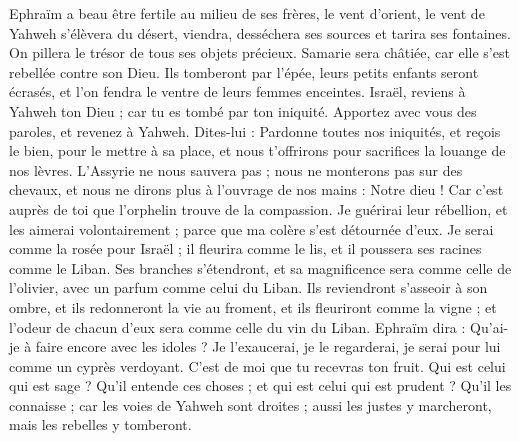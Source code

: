 \begin{multicols}{2}
Ephraïm a beau être fertile au milieu de ses frères, le vent d'orient, le vent de Yahweh s'élèvera du désert, viendra, desséchera ses sources et tarira ses fontaines. On pillera le trésor de tous ses objets précieux.
Samarie sera châtiée, car elle s'est rebellée contre son Dieu. Ils tomberont par l'épée, leurs petits enfants seront écrasés, et l'on fendra le ventre de leurs femmes enceintes.
\VerseOne{}Israël, reviens à Yahweh ton Dieu ; car tu es tombé par ton iniquité.
Apportez avec vous des paroles, et revenez à Yahweh. Dites-lui : Pardonne toutes nos iniquités, et reçois le bien, pour le mettre à sa place, et nous t'offrirons pour sacrifices la louange de nos lèvres.
L'Assyrie ne nous sauvera pas ; nous ne monterons pas sur des chevaux, et nous ne dirons plus à l'ouvrage de nos mains : Notre dieu ! Car c'est auprès de toi que l'orphelin trouve de la compassion.
Je guérirai leur rébellion, et les aimerai volontairement ; parce que ma colère s'est détournée d'eux.
Je serai comme la rosée pour Israël ; il fleurira comme le lis, et il poussera ses racines comme le Liban.
Ses branches s'étendront, et sa magnificence sera comme celle de l'olivier, avec un parfum comme celui du Liban.
Ils reviendront s'asseoir à son ombre, et ils redonneront la vie au froment, et ils fleuriront comme la vigne ; et l'odeur de chacun d'eux sera comme celle du vin du Liban.
Ephraïm dira : Qu'ai-je à faire encore avec les idoles ? Je l'exaucerai, je le regarderai, je serai pour lui comme un cyprès verdoyant. C'est de moi que tu recevras ton fruit.
Qui est celui qui est sage ? Qu'il entende ces choses ; et qui est celui qui est prudent ? Qu'il les connaisse ; car les voies de Yahweh sont droites ; aussi les justes y marcheront, mais les rebelles y tomberont.
\PPE{}
\end{multicols}
